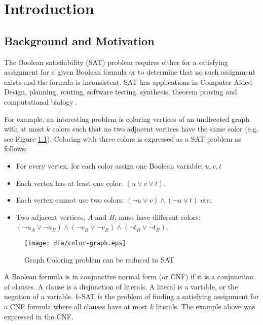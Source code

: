 \chapter{Introduction}

\section{Background and Motivation}

The Boolean satisfiability (SAT) problem requires either for a satisfying
assignment for a given Boolean formula or to determine that no such
assignment exists and the formula is inconsistent.  SAT has
applications in Computer Aided Design, planning, routing,
software testing, synthesis, theorem proving and computational
biology \cite{Smith_diagnosis, Soeken:2010:VUM:1870926.1871248,
demoura2008z3, Corblin07asat-based, Kautz:1992:PS:145448.146725}.

For example, an interesting problem is coloring vertices
of an undirected graph with at most $k$ colors such that no
two adjacent vertices have the same color (e.g. see Figure
\ref{fig:color-graph}). Coloring with three colors is expressed as
a SAT problem as follows:
\begin{itemize}
  \item For every vertex, for each color assign one Boolean variable: $u, v, t$
  \item Each vertex has at least one color: $(u \lor v \lor t)$.
  \item Each vertex cannot use two colors:
  $(\neg u \lor v) \land (\neg u \lor t)$ etc.
  \item Two adjacent vertices, $A$ and $B$, must have different colors:
  $(\neg u_A \lor \neg u_B) \land (\neg v_B \lor \neg v_B) \land (\neg t_B \lor \neg t_B)$.
\end{itemize}

\begin{figure}
  \centering
  \texttt{[image: dia/color-graph.eps]}
  \caption{Graph Coloring problem can be reduced to SAT}
  \label{fig:color-graph}
\end{figure}

A Boolean formula is in conjunctive normal form (or CNF) if it is
a conjunction of clauses. A clause is a disjunction of literals. A
literal is a variable, or the negation of a variable. $k$-SAT is
the problem of finding a satisfying assignment for a CNF formula
where all clauses have at most $k$ literals.  The example above
was expressed in the CNF.

